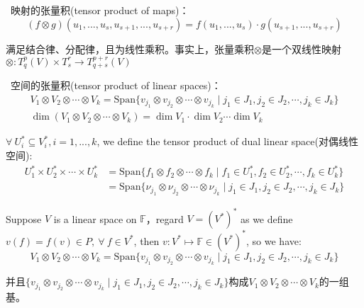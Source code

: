 \documentclass[zihao=-4,UTF8]{report}
\def\F{\mathbb{F}}
\theoremstyle{mystyle} %
\begin{document}
\  映射的张量积(tensor product of maps)：
\begin{equation*}
    (f \otimes g)(u_1,...,u_s,u_{s+1},...,u_{s+r}) = f(u_1,...,u_s)\cdot g(u_{s+1},...,u_{s+r})
\end{equation*}
{\par\color{gray}\small
满足结合律、分配律，且为线性乘积。事实上，张量乘积$\otimes$是一个双线性映射$\otimes: T^p_q(V)\times T^r_s \longrightarrow T^{p+r}_{q+s}(V)$\par}
\par
{}\ 空间的张量积(tensor product of linear spaces)： 
\begin{gather*}
    V_1 \otimes V_2 \otimes \cdots \otimes V_k = \text{Span}\{v_{j_1} \otimes v_{j_2} \otimes\cdots \otimes v_{j_k}\mid j_1\in J_1,j_2\in J_2,\cdots,j_k\in J_k\}\\ 
    \dim (V_1 \otimes V_2 \otimes \cdots \otimes V_k) = \dim V_1 \cdot \dim V_2 \cdots  \dim V_k
\end{gather*}
\par

{\par\color{gray}\small
$\forall\  U^*_i \subseteq V^*_i, i=1,...,k$, we define the tensor product of dual linear space(对偶线性空间): 
\begin{align*}
    U^*_1\times U^*_2\times \cdots \times U^*_k &= \text{Span}\{f_1 \otimes f_2 \otimes \cdots \otimes f_k \mid f_1 \in U^*_1, f_2 \in U^*_2, \cdots, f_k \in U^*_k\}\\
    &=\text{Span}\{\nu_{j_1} \otimes\nu_{j_2} \otimes\cdots \otimes\nu_{j_k}\mid j_1\in J_1,j_2\in J_2,\cdots,j_k\in J_k\}
\end{align*}

Suppose $V$ is a linear space on $\F$，regard $V = (V^*)^*$ as we define $v(f) = f(v) \in P,\ \forall\ f \in V^*$, then $v: V^* \longmapsto \F \in (V^*)^*$, so we have:
\begin{equation*}
    V_1 \otimes V_2 \otimes \cdots \otimes V_k = \text{Span}\{v_{j_1} \otimes v_{j_2} \otimes\cdots \otimes v_{j_k}\mid j_1\in J_1,j_2\in J_2,\cdots,j_k\in J_k\}
\end{equation*}

并且$\{v_{j_1} \otimes v_{j_2} \otimes\cdots \otimes v_{j_k}\mid j_1\in J_1,j_2\in J_2,\cdots,j_k\in J_k\}$构成$V_1 \otimes V_2 \otimes \cdots \otimes V_k$的一组基。
\par}
\end{document}
